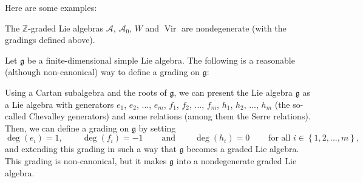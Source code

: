 \documentclass[etingof-lie.tex]{subfiles}
\begin{document}
Here are some examples:

\begin{proposition}
The $\mathbb{Z}$-graded Lie algebras $\mathcal{A}$, $\mathcal{A}_{0}$, $W$ and
$\operatorname*{Vir}$ are nondegenerate (with the gradings defined above).
\end{proposition}

\begin{proposition}
\label{prop.grad.g}Let $\mathfrak{g}$ be a finite-dimensional simple Lie
algebra. The following is a reasonable (although non-canonical) way to define
a grading on $\mathfrak{g}$:

Using a Cartan subalgebra and the roots of $\mathfrak{g}$, we can present the
Lie algebra $\mathfrak{g}$ as a Lie algebra with generators $e_{1}$, $e_{2}$,
$...$, $e_{m}$, $f_{1}$, $f_{2}$, $...$, $f_{m}$, $h_{1}$, $h_{2}$, $...$,
$h_{m}$ (the so-called Chevalley generators) and some relations (among them
the Serre relations). Then, we can define a grading on $\mathfrak{g}$ by
setting
\[
\deg\left(  e_{i}\right)  =1,\ \ \ \ \ \ \ \ \ \ \deg\left(  f_{i}\right)
=-1\ \ \ \ \ \ \ \ \ \ \text{and}\ \ \ \ \ \ \ \ \ \ \deg\left(  h_{i}\right)
=0\ \ \ \ \ \ \ \ \ \ \text{for all }i\in\left\{  1,2,...,m\right\}  ,
\]
and extending this grading in such a way that $\mathfrak{g}$ becomes a graded
Lie algebra. This grading is non-canonical, but it makes $\mathfrak{g}$ into a
nondegenerate graded Lie algebra.
\end{proposition}
\end{document}
